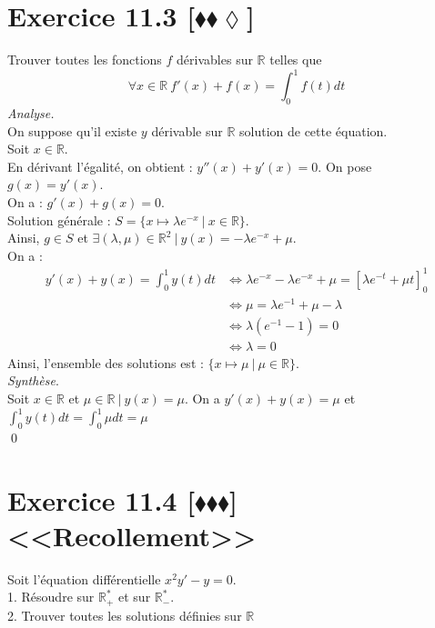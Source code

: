 \documentclass[10pt]{article}
\begin{document}
\section*{Exercice 11.3 [$\blacklozenge\blacklozenge\lozenge$]}
\begin{tcolorbox}[enhanced, width=7in, center, size=fbox, fontupper=\large, drop shadow southwest]
    Trouver toutes les fonctions $f$ dérivables sur $\mathbb{R}$ telles que
    \begin{equation*}
        \forall{x \in \mathbb{R}} ~ f'(x) + f(x) = \int_0^1{f(t)dt}
    \end{equation*}
    \emph{Analyse.}\\[0.1cm]
    On suppose qu'il existe $y$ dérivable sur $\mathbb{R}$ solution de cette équation.\\[0.1cm]
    Soit $x\in\mathbb{R}$.\\
    En dérivant l'égalité, on obtient : $y''(x) + y'(x) = 0$. On pose $g(x)=y'(x)$.\\
    On a : $g'(x) + g(x) = 0$.\\
    Solution générale : $S = \{x\mapsto \lambda e^{-x} ~ | ~ x\in\mathbb{R}\}$.\\
    Ainsi, $g \in S$ et $\exists (\lambda, \mu) \in \mathbb{R}^2 ~ | ~ y(x) = -\lambda e^{-x} + \mu$.\\
    On a :
    \begin{align*}
        y'(x) + y(x) = \int_0^1y(t)dt &\iff \lambda e^{-x} - \lambda e^{-x} + \mu = \left[\lambda e^{-t} + \mu t\right]_0^1\\
        &\iff \mu = \lambda e^{-1} + \mu - \lambda\\
        &\iff \lambda(e^{-1} -1) = 0\\
        &\iff \lambda = 0
    \end{align*}
    Ainsi, l'ensemble des solutions est : $\{x\mapsto\mu ~ | ~ \mu \in \mathbb{R}\}$.\\
    \emph{Synthèse}.\\
    Soit $x\in\mathbb{R}$ et $\mu\in\mathbb{R} ~ | ~ y(x)=\mu$. On a $y'(x) + y(x) = \mu$ et $\int_0^1y(t)dt=\int_0^1\mu dt=\mu$\\
    \qed
\end{tcolorbox}



\section*{Exercice 11.4 [$\blacklozenge\blacklozenge\blacklozenge$] <<Recollement>>}
\begin{tcolorbox}[enhanced, width=7in, center, size=fbox, fontupper=\large, drop shadow southwest]
    Soit l'équation différentielle $x^2y' - y = 0$.\\
    1. Résoudre sur $\mathbb{R}^*_+$ et sur $\mathbb{R}^*_-$.\\
    2. Trouver toutes les solutions définies sur $\mathbb{R}$
\end{tcolorbox}

\end{document}
